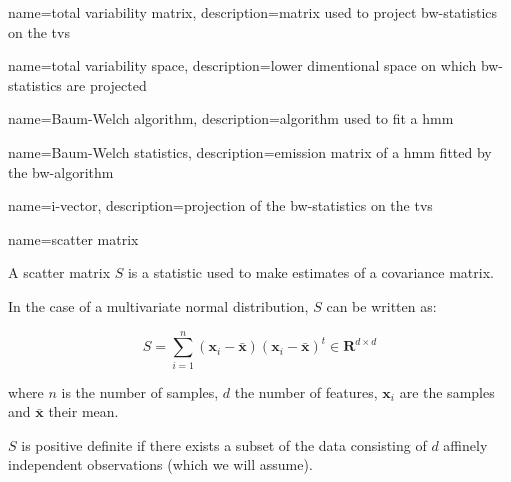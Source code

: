


{
    name=total variability matrix,
    description={matrix used to project \gls{bw-statistics} on the \gls{tvs}}
}

{
    name=total variability space,
    description={lower dimentional space on which \gls{bw-statistics}
        are projected}
}

{
    name=Baum-Welch algorithm,
    description={algorithm used to fit a \gls{hmm}}
}

{
    name=Baum-Welch statistics,
    description={emission matrix of a \gls{hmm} fitted by the
        \gls{bw-algorithm}}
}

{
    name=i-vector,
    description={projection of the \gls{bw-statistics} on the \gls{tvs}}
}

{
    name=scatter matrix
}
{
A scatter matrix $S$ is a statistic used to make estimates of a covariance
matrix.

In the case of a multivariate normal distribution, $S$ can be written as:

$$S = \sum_{i=1}^n (\bm{x}_i - \bar{\bm{x}})
(\bm{x}_i - \bar{\bm{x}})^t \in \bm{R}^{d \times d}$$

where $n$ is the number of samples, $d$ the number of features, $\bm{x}_i$
are the samples and $\bar{\bm x}$ their mean.

$S$ is positive definite if there exists a subset of the data consisting of $d$
affinely independent observations (which we will assume).
}
